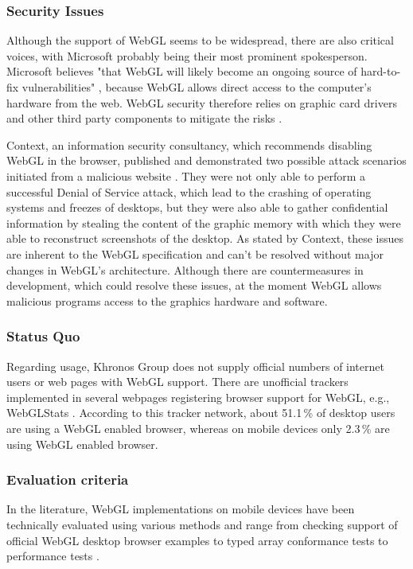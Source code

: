 \documentclass[12pt,journal,compsoc]{IEEEtran}
\begin{document}
\subsubsection{Security Issues}
Although the support of WebGL seems to be widespread, there are also critical voices, with Microsoft probably being their most prominent spokesperson. Microsoft believes "that WebGL will likely become an ongoing source of hard-to-fix vulnerabilities" \cite{microsoftWebGLHarmful}, because WebGL allows direct access to the computer’s hardware from the web. WebGL security therefore relies on graphic card drivers and other third party components to mitigate the risks \cite{microsoftWebGLHarmful}.

Context, an information security consultancy, which recommends disabling WebGL in the browser, published and demonstrated two possible attack scenarios initiated from a malicious website \cite{contextWebGL1, contextWebGL2}. They were not only able to perform a successful Denial of Service attack, which lead to the crashing of operating systems and freezes of desktops, but they were also able to gather confidential information by stealing the content of the graphic memory with which they were able to reconstruct screenshots of the desktop. As stated by Context, these issues are inherent to the WebGL specification and can't be resolved without major changes in WebGL's architecture. Although there are countermeasures in development, which could resolve these issues, at the moment WebGL allows malicious programs access to the graphics hardware and software. \cite{contextWebGL1, contextWebGL2}


\subsubsection{Status Quo}
Regarding usage, Khronos Group does not supply official numbers of internet users or web pages with WebGL support. There are unofficial trackers implemented in several webpages registering browser support for WebGL, e.g., WebGLStats \cite{WebGLStats}. According to this tracker network, about 51.1\,\% of desktop users are using a WebGL enabled browser, whereas on mobile devices only 2.3\,\% are using WebGL enabled browser.


\subsubsection{Evaluation criteria}
In the literature, WebGL implementations on mobile devices have been technically evaluated using various methods and range from checking support of official WebGL desktop browser examples to typed array conformance tests to performance tests \cite{Golubovic2011}. 
\end{document}
